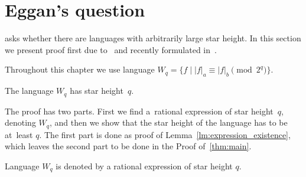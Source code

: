 \chapter{Eggan's question}

\cite{Eggan63} asks whether there are languages with arbitrarily large star height. In this section we present proof first due to~\cite{DejeanSchutzenberger66} and recently formulated in~\cite{Sakarovitch09}.

Throughout this chapter we use language $W_q = {\{f \mid |f|_a \equiv |f|_b \pmod{2^q} \}}$.

\begin{thm}\label{thm:main}
    The language $W_q$ has star height~$q$.
\end{thm}

The proof has two parts. First we find a~rational expression of star height~$q$, denoting $W_q$, and then we show that the star height of the language has to be at~least $q$. The first part is done as proof of Lemma~\ref*{lm:expression_existence}, which leaves the second part to be done in the Proof of~\autoref*{thm:main}.

\begin{lemma}\label{lm:expression_existence}
    Language $W_q$ is denoted by a rational expression of star height $q$.
\end{lemma}

